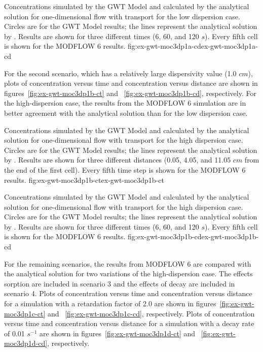 \begin{StandardFigure}{
                                     Concentrations simulated by the \mf GWT Model and calculated by the analytical solution for one-dimensional flow with transport for the low dispersion case.  Circles are for the GWT Model results; the lines represent the analytical solution by \cite{wexler1992}.  Results are shown for three different times (6, 60, and 120 $s$).  Every fifth cell is shown for the MODFLOW 6 results.
                                     }{fig:ex-gwt-moc3dp1a-cd}{ex-gwt-moc3dp1a-cd}
\end{StandardFigure}            

For the second scenario, which has a relatively large dispersivity value (1.0 $cm$), plots of concentration versus time and concentration versus distance are shown in figures~\ref{fig:ex-gwt-moc3dp1b-ct} and ~\ref{fig:ex-gwt-moc3dp1b-cd}, respectively.  For the high-dispersion case, the results from the MODFLOW 6 simulation are in better agreement with the analytical solution than for the low dispersion case.

\begin{StandardFigure}{
                                     Concentrations simulated by the \mf GWT Model and calculated by the analytical solution for one-dimensional flow with transport for the high dispersion case.  Circles are for the GWT Model results; the lines represent the analytical solution by \cite{wexler1992}.  Results are shown for three different distances (0.05, 4.05, and 11.05 $cm$ from the end of the first cell).  Every fifth time step is shown for the MODFLOW 6 results.
                                     }{fig:ex-gwt-moc3dp1b-ct}{ex-gwt-moc3dp1b-ct}
\end{StandardFigure}            

\begin{StandardFigure}{
                                     Concentrations simulated by the \mf GWT Model and calculated by the analytical solution for one-dimensional flow with transport for the high dispersion case.  Circles are for the GWT Model results; the lines represent the analytical solution by \cite{wexler1992}.  Results are shown for three different times (6, 60, and 120 $s$).  Every fifth cell is shown for the MODFLOW 6 results.
                                     }{fig:ex-gwt-moc3dp1b-cd}{ex-gwt-moc3dp1b-cd}
\end{StandardFigure}            


For the remaining scenarios, the results from MODFLOW 6 are compared with the \cite{wexler1992} analytical solution for two variations of the high-dispersion case.  The effects sorption are included in scenario 3 and the effects of decay are included in scenario 4.  Plots of concentration versus time and concentration versus distance for a simulation with a retardation factor of 2.0 are shown in figures~\ref{fig:ex-gwt-moc3dp1c-ct} and ~\ref{fig:ex-gwt-moc3dp1c-cd}, respectively.  Plots of concentration versus time and concentration versus distance for a simulation with a decay rate of 0.01 $s^{-1}$ are shown in figures~\ref{fig:ex-gwt-moc3dp1d-ct} and ~\ref{fig:ex-gwt-moc3dp1d-cd}, respectively.

